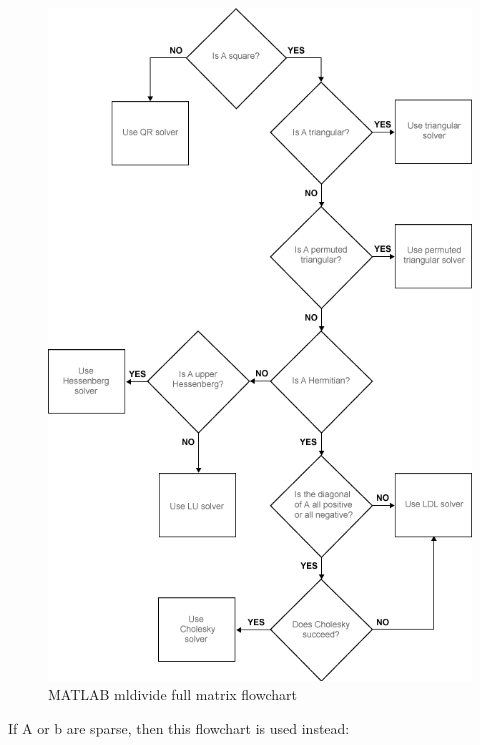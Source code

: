\documentclass[12pt,letterpaper,reqno]{amsart}
\begin{document}
\begin{enumerate}
\begin{flushleft}
\begin{enumerate}
\begin{flushleft}
    \begin{figure}[h]
        \includegraphics[scale = 0.4]{mldivide_full.png}
        \caption{MATLAB mldivide full matrix flowchart}
    \end{figure}
    
    \newpage
    If A or b are sparse, then this flowchart is used instead:\newline
    

\end{flushleft}
\end{enumerate}
\end{flushleft}
\end{enumerate}
\end{document}
